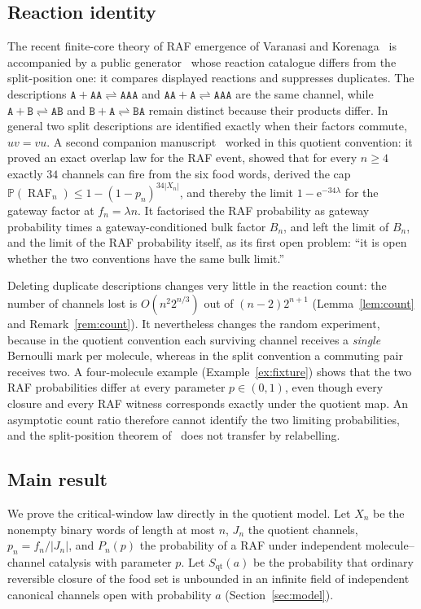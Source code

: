 \documentclass[11pt,a4paper]{article}
\theoremstyle{plain}
\theoremstyle{definition}
\theoremstyle{remark}
\newcommand{\Prob}{\mathbb{P}}
\newcommand{\qt}{\mathrm{qt}}
\newcommand{\ee}{\mathrm{e}}
\newcommand{\word}[1]{\mathtt{#1}}
\DeclareMathOperator{\RAF}{RAF}
\begin{document}
\subsection*{Reaction identity}
The recent finite-core theory of RAF emergence of Varanasi and Korenaga~\cite{varanasi2026emergence} is accompanied by a public generator~\cite{varanasi2026repository} whose reaction catalogue differs from the split-position one: it compares displayed reactions and suppresses duplicates. The descriptions $\word A+\word{AA}\rightleftharpoons\word{AAA}$ and $\word{AA}+\word A\rightleftharpoons\word{AAA}$ are the same channel, while $\word A+\word B\rightleftharpoons\word{AB}$ and $\word B+\word A\rightleftharpoons\word{BA}$ remain distinct because their products differ. In general two split descriptions are identified exactly when their factors commute, $uv=vu$. A second companion manuscript~\cite{overlapgateway2026} worked in this quotient convention: it proved an exact overlap law for the RAF event, showed that for every $n\ge4$ exactly $34$ channels can fire from the six food words, derived the cap $\Prob(\RAF_n)\le1-(1-p_n)^{34|X_n|}$, and thereby the limit $1-\ee^{-34\lambda}$ for the gateway factor at $f_n=\lambda n$. It factorised the RAF probability as gateway probability times a gateway-conditioned bulk factor $B_n$, and left the limit of $B_n$, and the limit of the RAF probability itself, as its first open problem: ``it is open whether the two conventions have the same bulk limit.''

Deleting duplicate descriptions changes very little in the reaction count: the number of channels lost is $O(n^2 2^{n/3})$ out of $(n-2)2^{n+1}$ (Lemma~\ref{lem:count} and Remark~\ref{rem:count}). It nevertheless changes the random experiment, because in the quotient convention each surviving channel receives a \emph{single} Bernoulli mark per molecule, whereas in the split convention a commuting pair receives two. A four-molecule example (Example~\ref{ex:fixture}) shows that the two RAF probabilities differ at every parameter $p\in(0,1)$, even though every closure and every RAF witness corresponds exactly under the quotient map. An asymptotic count ratio therefore cannot identify the two limiting probabilities, and the split-position theorem of~\cite{criticalwindow2026} does not transfer by relabelling.

\subsection*{Main result}
We prove the critical-window law directly in the quotient model. Let $X_n$ be the nonempty binary words of length at most $n$, $J_n$ the quotient channels, $p_n=f_n/|J_n|$, and $P_n(p)$ the probability of a RAF under independent molecule--channel catalysis with parameter $p$. Let $S_{\qt}(a)$ be the probability that ordinary reversible closure of the food set is unbounded in an infinite field of independent canonical channels open with probability $a$ (Section~\ref{sec:model}).
\end{document}
